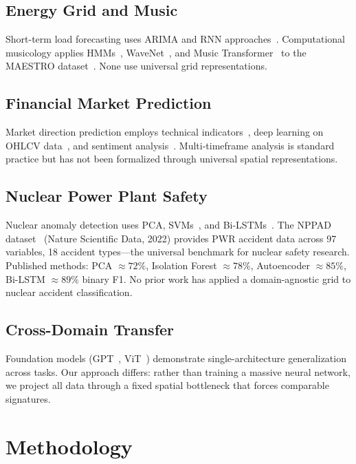 \documentclass[12pt,a4paper]{article}
\begin{document}
\subsection{Energy Grid and Music}
Short-term load forecasting uses ARIMA and RNN approaches~\cite{hong2016,shi2018}. Computational
musicology applies HMMs~\cite{rabiner1989}, WaveNet~\cite{wavenet2016}, and Music
Transformer~\cite{musictransformer2019} to the MAESTRO dataset~\cite{maestro2019}. None use
universal grid representations.

\subsection{Financial Market Prediction}
Market direction prediction employs technical indicators~\cite{murphy1999}, deep learning on
OHLCV data~\cite{bao2017}, and sentiment analysis~\cite{xu2018}. Multi-timeframe analysis is
standard practice but has not been formalized through universal spatial representations.

\subsection{Nuclear Power Plant Safety}
Nuclear anomaly detection uses PCA, SVMs~\cite{barber2019}, and Bi-LSTMs~\cite{li2021}. The
NPPAD dataset~\cite{nppad2022} (Nature Scientific Data, 2022) provides PWR accident data across 97
variables, 18 accident types---the universal benchmark for nuclear safety research. Published
methods: PCA ${\approx}72\%$, Isolation Forest ${\approx}78\%$, Autoencoder ${\approx}85\%$,
Bi-LSTM ${\approx}89\%$ binary F1. No prior work has applied a domain-agnostic grid to nuclear
accident classification.

\subsection{Cross-Domain Transfer}
Foundation models (GPT~\cite{brown2020}, ViT~\cite{dosovitskiy2021}) demonstrate single-architecture
generalization across tasks. Our approach differs: rather than training a massive neural network, we
project all data through a fixed spatial bottleneck that forces comparable signatures.

\section{Methodology}
\end{document}
